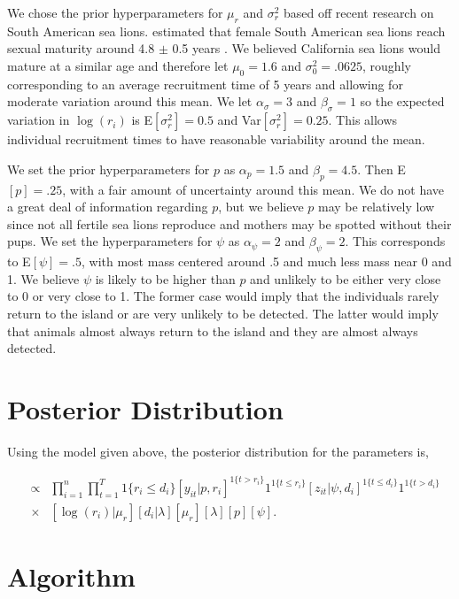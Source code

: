 \documentclass[12pt, a4paper]{article}
\begin{document}
We chose the prior hyperparameters for $\mu_r$ and $\sigma_r^2$ based off recent research on South American sea lions. \citet{Grandi} estimated that female South American sea lions reach sexual maturity around 4.8 $\pm$ 0.5 years . We believed California sea lions would mature at a similar age and therefore let $\mu_0 = 1.6$ and $\sigma_0^2 = .0625$, roughly corresponding to an average recruitment time of 5 years and allowing for moderate variation around this mean. We let $\alpha_{\sigma} = 3$ and $\beta_{\sigma} = 1$ so the expected variation in $\log(r_i)$ is E$[\sigma_r^2] = 0.5$ and Var$[\sigma_r^2] = 0.25$. This allows individual recruitment times to have reasonable variability around the mean. 

We set the prior hyperparameters for $p$ as $\alpha_p = 1.5$ and $\beta_p = 4.5$. Then E$[p] = .25$, with a fair amount of uncertainty around this mean. We do not have a great deal of information regarding $p$, but we believe $p$ may be relatively low since not all fertile sea lions reproduce and mothers may be spotted without their pups. We set the hyperparameters for $\psi$ as $\alpha_{\psi} = 2$ and $\beta_{\psi} = 2$. This corresponds to E$[\psi] = .5$, with most mass centered around .5 and much less mass near 0 and 1. We believe $\psi$ is likely to be higher than $p$ and unlikely to be either very close to 0 or very close to 1. The former case would imply that the individuals rarely return to the island or are very unlikely to be detected. The latter would imply that animals almost always return to the island and they are almost always detected.

\section{Posterior Distribution}

Using the model given above, the posterior distribution for the parameters is,

\begin{eqnarray*}
[\log (\mathbf{r}), \mu_r, p, \mathbf{d}, \lambda, \psi | \mathbf{z}, \mathbf{y} ] & \propto & \prod_{i=1}^n \prod_{t=1} ^T  1\{r_i \leq d_i \} [y_{it}|p,r_i]^{1\{ t > r_i \}} 1^{1\{ t \leq r_i \}} [z_{it}|\psi, d_i]^{1 \{ t \leq d_i\} } 1^{1 \{ t > d_i\}} \\
  & \times & [\log(r_i)|\mu_r][d_i|\lambda]  [\mu_r][\lambda][p][\psi].
\end{eqnarray*}


\section{Algorithm}
\end{document}
